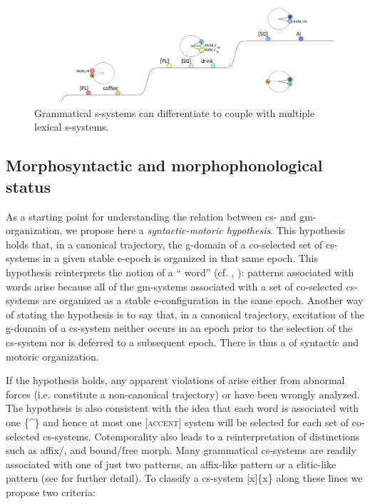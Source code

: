 \begin{enumerate}
  
\begin{figure}
\includegraphics[width=\textwidth]{figures/Tilsen-img67.png}
\caption{Grammatical s-systems can differentiate to couple with multiple lexical s-systems.}
\label{fig:4:17}
\end{figure}
\end{enumerate}
 

\subsection{Morphosyntactic and morphophonological status}

As a starting point for understanding the relation between cs- and gm-or\-ga\-ni\-za\-tion, we propose here a \textit{syntactic-motoric  hypothesis}. This hypothesis holds that, in a canonical trajectory, the g-domain of a co-selected set of cs-systems in a given stable e-epoch is organized in that same epoch. This hypothesis reinterprets the notion of a “ word” (cf. \citealt{NesporVogel1986}, \citealt{Selkirk1984,Selkirk2011}): patterns associated with  words arise because all of the gm-sys\-tems associated with a set of co-selected cs-systems are organized as a stable e-configuration in the same epoch. Another way of stating the hypothesis is to say that, in a canonical trajectory, excitation of the g-domain of a cs-system neither occurs in an epoch prior to the selection of the cs-system nor is deferred to a subsequent epoch. There is thus a  of syntactic and motoric organization. 

  If the  hypothesis holds, any apparent violations of  arise either from abnormal  forces (i.e. constitute a non-canonical trajectory) or have been wrongly analyzed. The hypothesis is also consistent with the idea that each  word is associated with one  \{\^{}\} and hence at most one [\textsc{accent}] system will be selected for each set of co-selected cs-systems. Cotemporality also leads to a reinterpretation of  distinctions such as affix/, and bound/free morph. Many grammatical cs-systems are readily associated with one of just two  patterns, an affix-like pattern or a clitic-like pattern (see \citealt{Payne1997,Zwicky1985,ZwickyPullum1983} for further detail). To classify a cs-system [x]\{x\} along these lines we propose two criteria:\\

